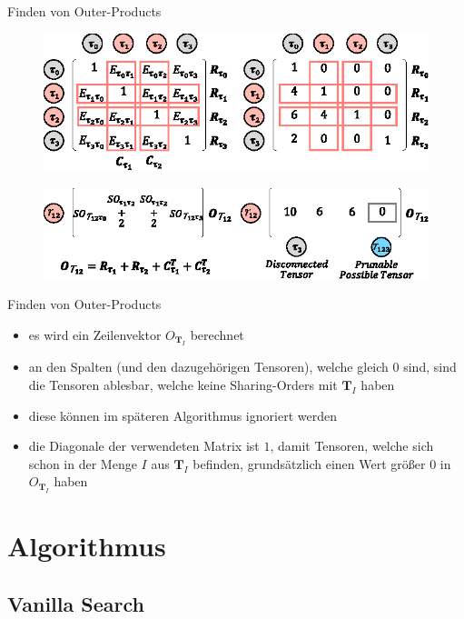 \documentclass{beamer}
\begin{document}
\begin{frame}{Finden von Outer-Products}
	\begin{figure}
		\includegraphics[scale=1.1]{figure_05_e_g}
	\end{figure} \pause
	\begin{figure}
		\includegraphics[scale=1.2]{figure_05_f_h}
	\end{figure}
\end{frame}

\begin{frame}{Finden von Outer-Products}
	\begin{itemize}
		\item es wird ein Zeilenvektor $O_{\bm{T}_I}$ berechnet
		\item an den Spalten (und den dazugehörigen Tensoren), welche gleich $0$ sind, sind die Tensoren ablesbar, welche keine Sharing-Orders mit $\bm{T}_I$ haben
		\item diese können im späteren Algorithmus ignoriert werden \pause
		\item die Diagonale der verwendeten Matrix ist $1$, damit Tensoren, welche sich schon in der Menge $I$ aus $\bm{T}_I$ befinden, grundsätzlich einen Wert größer $0$ in $O_{\bm{T}_I}$ haben
	\end{itemize}
\end{frame}



\section{Algorithmus}



\subsection{Vanilla Search}
\end{document}
